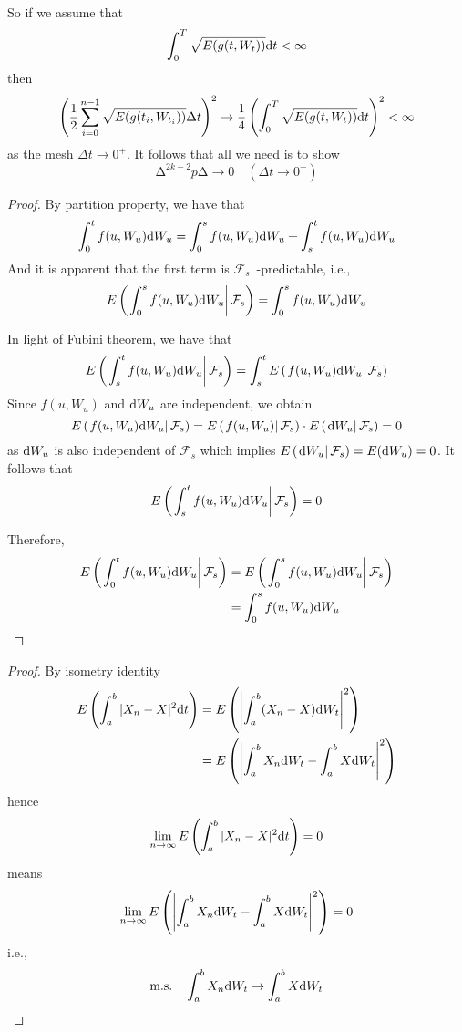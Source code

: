 \documentclass{homework}
\begin{document}
\begin{subproblem}[(\alph*)]
        So if we assume that
        \[\int_0^T\sqrt{E(g(t,W_{t}))}\mathrm d t<\infty\]
        then
        \[
            \left(\frac12\sum_{i=0}^{n-1}\sqrt{E(g(t_i,W_{t_i}))}\Delta t\right)^2
            \to
            \frac14\left(\int_0^T\sqrt{E(g(t,W_{t}))}\mathrm d t\right)^2
            <\infty
        \]
        as the mesh $\Delta t\to 0^+$.
        It follows that all we need is to show
        \[\increment^{2k-2}p\increment\to 0\quad(\Delta t\to 0^+)\]
        
    \end{subproblem}

    \problem
    \begin{proof}
        \newcommand{\conde}[1]{E\left(\left. #1\right|\mathcal F_s\right)}
        By partition property, we have that
        \[\int_0^tf(u,W_u)\mathrm d W_u=\int_0^sf(u,W_u)\mathrm d W_u
        +\int_s^tf(u,W_u)\mathrm d W_u\]
        And it is apparent that the first term is
        $\mathcal F_s$~-predictable, i.e.,
        \[\conde{\int_0^sf(u,W_u)\diff W_u}=\int_0^sf(u,W_u)\diff W_u\]
        

        In light of Fubini theorem, we have that
        \[\conde{\int_s^tf(u,W_u)\diff W_u}
            =\int_s^t\conde{f(u,W_u)\diff W_u}\]
        Since $f(u,W_u)$ and $\mathrm d W_u$ are independent, we obtain
        \[\conde{f(u,W_u)\diff W_u}=\conde{f(u,W_u)}\cdot\conde{\diff W_u}
        =0\]
        as $\mathrm d W_u$ is also independent of $\mathcal F_s$ which implies
        $\conde{\diff W_u}=E(\diff W_u)=0$. It follows that
        \[\conde{\int_s^tf(u,W_u)\diff W_u}=0\]

        Therefore,
        \[\begin{aligned}
        \conde{\int_0^tf(u,W_u)\diff W_u}
        &=\conde{\int_0^sf(u,W_u)\diff W_u}\\
        &=\int_0^sf(u,W_u)\diff W_u
        \end{aligned}\]
    \end{proof}


    \problem
    \begin{proof}
        By isometry identity
        \[\begin{aligned}
            E\left(\int_a^b|X_n-X|^2\mathrm d t\right)
            &=E\left(\left|\int_a^b(X_n-X)\mathrm d W_t\right|^2\right)\\
            &=E\left(\left|
            \int_a^bX_n\mathrm d W_t-\int_a^bX\mathrm d W_t
            \right|^2\right)
        \end{aligned}\]
        hence
        \[\lim_{n\to\infty}E\left(
            \int_a^b|X_n-X|^2\mathrm d t\right)=0\]
        means
        \[\lim_{n\to\infty}E\left(\left|
            \int_a^bX_n\mathrm d W_t-\int_a^bX\mathrm d W_t
            \right|^2\right)=0\]
        i.e.,
        \[\text{m.s.}\quad
        \int_a^bX_n\mathrm d W_t\to\int_a^bX\mathrm d W_t\]
    \end{proof}
\end{document}
